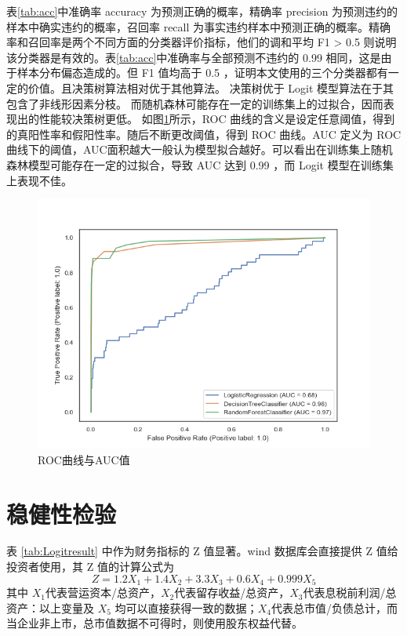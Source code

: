 表\ref{tab:acc}中准确率 accuracy 为预测正确的概率，精确率 precision 为预测违约的样本中确实违约的概率，召回率 recall 为事实违约样本中预测正确的概率。精确率和召回率是两个不同方面的分类器评价指标，他们的调和平均 F1 > 0.5 则说明该分类器是有效的。表\ref{tab:acc}中准确率与全部预测不违约的 0.99 相同，这是由于样本分布偏态造成的。但 F1 值均高于 0.5 ，证明本文使用的三个分类器都有一定的价值。且决策树算法相对优于其他算法。
决策树优于 Logit 模型算法在于其包含了非线形因素分枝。
而随机森林可能存在一定的训练集上的过拟合，因而表现出的性能较决策树更低。
如图\ref{fig:roc}所示，ROC 曲线的含义是设定任意阈值，得到的真阳性率和假阳性率。随后不断更改阈值，得到 ROC 曲线。AUC 定义为 ROC 曲线下的阈值，AUC面积越大一般认为模型拟合越好。可以看出在训练集上随机森林模型可能存在一定的过拟合，导致 AUC 达到 0.99 ，而 Logit 模型在训练集上表现不佳。
\begin{figure}[h]
	\centering
	\includegraphics[width=.9\linewidth]{./data/roc.png}
	\caption{\label{fig:roc}ROC曲线与AUC值}
\end{figure}

\section{稳健性检验}
表 \ref{tab:Logitresult} 中作为财务指标的 Z 值显著。wind 数据库会直接提供 Z 值给投资者使用，其 Z 值的计算公式为
\begin{equation}
	\label{eq:1}
	Z=1.2X_1+1.4X_2+3.3X_3+0.6X_4+0.999X_5
\end{equation}
其中 \(X_1\)代表营运资本/总资产，\(X_2\)代表留存收益/总资产，\(X_3\)代表息税前利润/总资产：以上变量及 \(X_5\) 均可以直接获得一致的数据；\(X_4\)代表总市值/负债总计，而当企业非上市，总市值数据不可得时，则使用股东权益代替。


